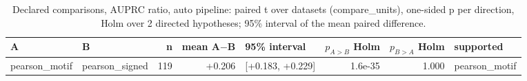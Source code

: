 \begin{table}[H]\centering\small
\caption{Declared comparisons, AUPRC ratio, auto pipeline: paired t over datasets (compare\_units), one-sided p per direction, Holm over 2 directed hypotheses; 95\% interval of the mean paired difference.}
\begin{tabular}{llrrlrrl}\toprule
A & B & n & mean A$-$B & 95\% interval & $p_{A>B}$ Holm & $p_{B>A}$ Holm & supported \\ \midrule
pearson\_motif & pearson\_signed & 119 & +0.206 & [+0.183, +0.229] & 1.6e-35 & 1.000 & pearson\_motif \\
\bottomrule\end{tabular}\end{table}
